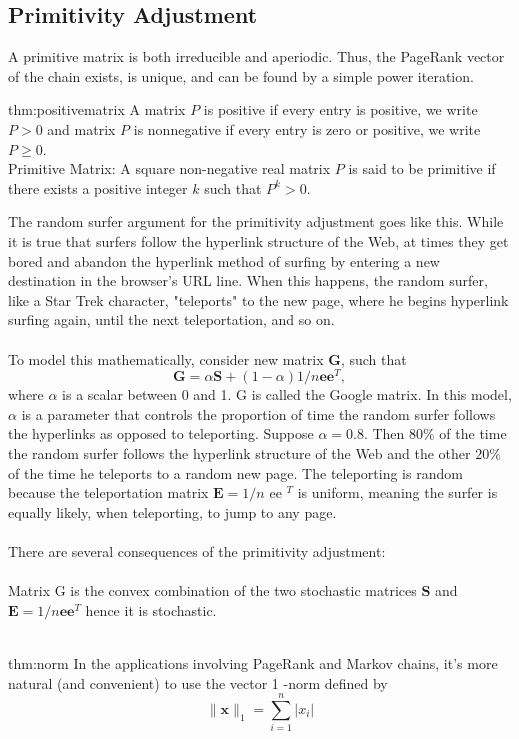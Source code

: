 \subsection{Primitivity Adjustment}

A primitive matrix is both irreducible and aperiodic. Thus, the PageRank vector of the chain exists, is unique, and can be found by a simple power iteration.\\
\begin{thm}{thm:positivematrix}
	A matrix $P$ is positive if every entry is positive, we write $P>0$ and matrix $P$ is nonnegative if every entry is zero or positive, we write $P \geq 0$.\\
	Primitive Matrix: A square non-negative real matrix $P$ is said to be primitive if there exists a positive integer $k$ such that $P^{k}>0$.
\end{thm}

\noindent The random surfer argument for the primitivity adjustment goes like this. While it is true that surfers follow the hyperlink structure of the Web, at times they get bored and abandon the hyperlink method of surfing by entering a new destination in the browser's URL line. When this happens, the random surfer, like a Star Trek character, "teleports" to the new page, where he begins hyperlink surfing again, until the next teleportation, and so on.\\
\\
To model this mathematically, consider new matrix $\mathbf{G}$, such that
$$
\mathbf{G}=\alpha \mathbf{S}+(1-\alpha) 1 / n \mathbf{e e}^{T},
$$
where $\alpha$ is a scalar between 0 and 1. $\mathrm{G}$ is called the Google matrix. In this model, $\alpha$ is a parameter that controls the proportion of time the random surfer follows the hyperlinks as opposed to teleporting. Suppose $\alpha=0.8$. Then $80 \%$ of the time the random surfer follows the hyperlink structure of the Web and the other $20 \%$ of the time he teleports to a random new page. The teleporting is random because the teleportation matrix $\mathbf{E}=1 / n$ ee $^{T}$ is uniform, meaning the surfer is equally likely, when teleporting, to jump to any page.
\\
\\
There are several consequences of the primitivity adjustment:\\
\\
Matrix G is the convex combination of the two stochastic matrices $\mathbf{S}$ and $\mathbf{E}=1 / n \mathbf{e e}^{T}$ hence it is stochastic.\\
\\
\begin{thm}[Norm]{thm:norm}
	In the applications involving PageRank and Markov chains, it's more natural (and convenient) to use the vector 1 -norm defined by
	$$
	\|\mathbf{x}\|_{1}=\sum_{i=1}^{n}\left|x_{i}\right|
	$$
\end{thm}


